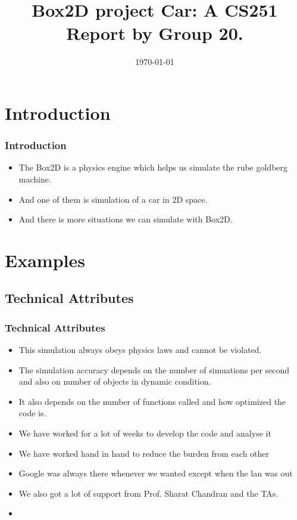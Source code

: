 \documentclass{beamer}
\author[Abhinav \& Surya \& Rishabh]
{%
   \texorpdfstring{
        \begin{columns}
            \column{.4\linewidth}
            \centering
            Abhinav\\
            {140050054}\\
            {abhinavrondi11296@gmail.com}
            \column{.4\linewidth}
            \centering
            Surya\\
            {140050055}\\
            {suri892010@gmail.com}
            \column{.33\linewidth}
            \centering
            Rishabh\\
            {140050061}\\
            {rishabh6417@gmail.com}
        \end{columns}
   }
   {John Doe \& Jane Doe}
}
\title{Box2D project Car: A CS251 Report by Group 20.}
\date{\today}
\begin{document}
\begin{frame}
\titlepage
\end{frame}
\section{Introduction}
\begin{frame}
\frametitle{Introduction}
\begin{itemize}
\item The Box2D is a physics engine which helps us simulate the rube goldberg machine.
\item And one of them is simulation of a car in 2D space.
\item And there is more situations we can simulate with Box2D.
\end{itemize}
\end{frame}
\section{Examples}
\subsection{Technical Attributes}
\begin{frame}
\frametitle{Technical Attributes}
\begin{itemize}
\item This simulation always obeys physics laws and cannot be violated.
\item The simulation accuracy depends on the number of simuations per second and also on number of objects in dynamic condition.
\item It also depends on the number of functions called and how optimized the code is.
\end{itemize}
\end{frame}
\begin{frame}
\begin{itemize}
\item We have worked for a lot of weeks to develop the code and analyse it
\item We have worked hand in hand to reduce the burden from each other
\end{itemize}
\end{frame}
\begin{frame}
\begin{itemize}
\item Google was always there whenever we wanted except when the lan was out
\item We also got a lot of support from Prof. Sharat Chandran and the TAs.
\item 
\end{itemize}
\end{frame}
\end{document}
